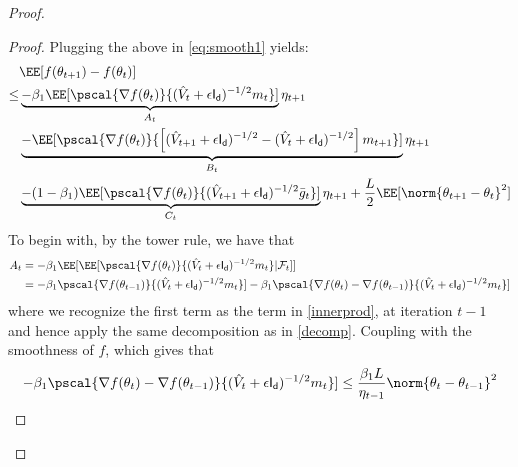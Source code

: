 \documentclass[11pt]{article}
\begin{document}
\begin{proof}
\begin{proof}
Plugging the above in \eqref{eq:smooth1} yields:
\begin{equation}\label{eq:main1}
\begin{split}
&\EE[f(\theta_{t+1}) - f(\theta_{t}) ] \\
\leq & \underbrace{- \beta_1\EE[ \pscal{\nabla f(\theta_t)}{(\hat{V}_{t} + \epsilon \mathsf{I_d})^{-1/2} m_{t}}]}_{A_t} \eta_{t+1}\\
& \underbrace{-  \EE[\pscal{\nabla f(\theta_t)}{\left[(\hat{V}_{t+1} + \epsilon \mathsf{I_d})^{-1/2} - (\hat{V}_{t} + \epsilon \mathsf{I_d})^{-1/2}  \right]m_{t+1}}]}_{B_t}\eta_{t+1}\\
& \underbrace{-  (1-\beta_1) \EE[\pscal{\nabla f(\theta_t)}{(\hat{V}_{t+1} + \epsilon \mathsf{I_d})^{-1/2} \bar{g}_t}]}_{C_t} \eta_{t+1}+ \frac{L}{2} \EE[\norm{\theta_{t+1} - \theta_{t}}^2]
\end{split}
\end{equation}
To begin with, by the tower rule, we have that 
\begin{align}
A_t & = - \beta_1\EE[\EE[\pscal{\nabla f(\theta_t)}{(\hat{V}_{t} + \epsilon \mathsf{I_d})^{-1/2} m_{t}}| \mathcal{F}_t]] \\
& = - \beta_1 \pscal{\nabla f(\theta_{t-1})}{(\hat{V}_{t} + \epsilon \mathsf{I_d})^{-1/2} m_{t}}] - \beta_1 \pscal{\nabla f(\theta_t) - \nabla f(\theta_{t-1})}{(\hat{V}_{t} + \epsilon \mathsf{I_d})^{-1/2} m_{t}}]\\
\end{align}
where we recognize the first term as the term in \eqref{innerprod}, at iteration $t-1$ and hence apply the same decomposition as in \eqref{decomp}.
Coupling with the smoothness of $f$, which gives that
$$
- \beta_1 \pscal{\nabla f(\theta_t) - \nabla f(\theta_{t-1})}{(\hat{V}_{t} + \epsilon \mathsf{I_d})^{-1/2} m_{t}}] \leq \frac{\beta_1 L}{\eta_{t-1}} \norm{\theta_t - \theta_{t-1}}^2
$$


\end{proof}
\end{proof}
\end{document}

